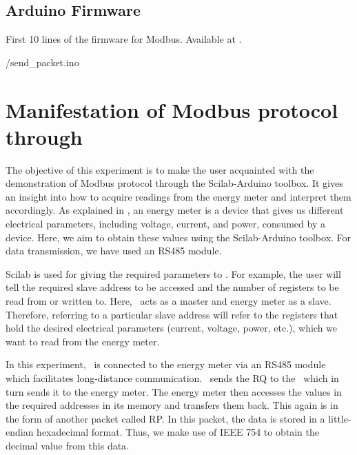 \subsection{Arduino Firmware}
\label{sec:firmware-modbus}
\begin{ardcode}
  {First 10 lines of the firmware for Modbus.  Available at
    .}
  \label{ard:firmware-modbus}
  
  {\LocMODardcode/send_packet.ino}
\end{ardcode}

\section{Manifestation of Modbus protocol through \scilab}
The objective of this experiment is to make the user acquainted with
the demonstration of Modbus protocol through the Scilab-Arduino toolbox. 
It gives an insight into how to acquire readings from the energy meter and interpret them accordingly. As explained in , 
an energy meter is a device that gives us different electrical parameters, including voltage, current, and power, consumed by a device. Here, we aim to obtain these values using the Scilab-Arduino toolbox. For data transmission, we have used an RS485 module.

Scilab is used for giving the required parameters to \arduino. For
example, the user will tell the required slave address to be accessed
and the number of registers to be read from or written to. Here,
\arduino\ acts as a master and energy meter as a slave. Therefore,
referring to a particular slave address will refer to the registers
that hold the desired electrical parameters (current, voltage, power, etc.), which we want to read from the energy meter.

In this experiment, \arduino\ is connected to the energy meter via an RS485 module which facilitates long-distance communication. 
\scilab\ sends the RQ to the \arduino\, which in turn sends it to the
energy meter. The energy meter then accesses the values in the
required addresses in its memory and transfers them back. This again
is in the form of another packet called RP. In this packet, the data is stored in a little-endian hexadecimal format. Thus, we make use of IEEE 754 to obtain the decimal value from this data. 



